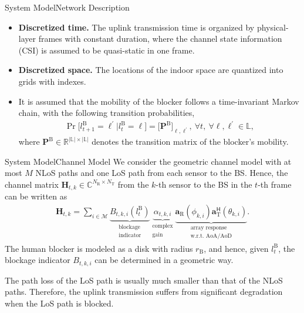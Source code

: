 \documentclass[aspectratio=169]{beamer}
\begin{document}
\begin{frame}{System Model}{Network Description}
    \begin{itemize}
        \item \textbf{Discretized time.} The uplink transmission time is organized by physical-layer frames with constant duration, where the channel state information (CSI) is assumed to be quasi-static in one frame.
        \item \textbf{Discretized space.} The locations of the indoor space are quantized into grids with indexes.
        \item It is assumed that the mobility of the blocker follows a time-invariant Markov chain, with the following transition probabilities,
        \begin{align*}
            \Pr\big[l_{t+1}^{\mathrm{B}}\!=\!\ell^{\prime}\big|l_{t}^{\mathrm{B}}\!=\!\ell\big]=\big[\mathbf{P}^{\mathrm{B}}\big]_{\ell,\ell^{\prime}},\ \forall{t},\ \forall \ell,\ell^{\prime}\in\mathbb{L},
        \end{align*}
        where $\mathbf{P}^{\mathrm{B}}\in\mathbb{R}^{|\mathbb{L}|\times|\mathbb{L}|}$ denotes the transition matrix of the blocker's mobility.
    \end{itemize}
\end{frame}

\begin{frame}{System Model}{Channel Model}
    We consider the geometric channel model with at most $M$ NLoS paths and one LoS path from each sensor to the BS. Hence, the channel matrix $\mathbf{H}_{t,k}\!\in\!\mathbb{C}^{N_{\mathrm{R}}\times N_{\mathrm{T}}}$ from the $k$-th sensor to the BS in the $t$-th frame can be written as
    \begin{align*}
        \label{eqn:H_tk}
        \mathbf{H}_{t,k}
        =
        \sum_{i\in\mathcal{M}}
        \underbrace{B_{t,k,i}(l_{t}^{\mathrm{B}})}_{
            \substack{\text{blockage}\\\text{indicator}}}
        \underbrace{\alpha_{t,k,i}}_{
            \substack{\text{complex}\\\text{gain}}}
        \underbrace{
            \mathbf{a}_{\mathrm{R}}(\phi_{k,i})
            \mathbf{a}_{\mathrm{T}}^{\mathsf{H}}(\theta_{k,i})}_{
                \substack{\text{array response}\\\text{w.r.t. AoA/AoD}}}.
    \end{align*}
    The human blocker is modeled as a disk with radius $r_{\mathrm{B}}$, and hence, given $l_{t}^{\mathrm{B}}$, the blockage indicator $B_{t,k,i}$ can be determined in a geometric way.

    The path loss of the LoS path is usually much smaller than that of the NLoS paths.
    Therefore, the uplink transmission suffers from significant degradation when the LoS path is blocked.
\end{frame}
\end{document}
